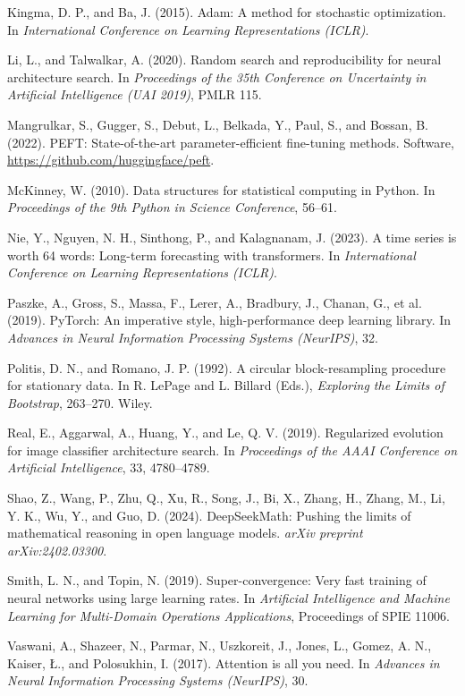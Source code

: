 \documentclass[11pt,letterpaper]{article}
\begin{document}
\begin{list}{}{\setlength{\leftmargin}{1.5em}\setlength{\itemindent}{-1.5em}\setlength{\itemsep}{2pt}\setlength{\parsep}{0pt}}
\item Kingma, D. P., and Ba, J. (2015). Adam: A method for stochastic optimization. In \textit{International Conference on Learning Representations (ICLR)}.
\item Li, L., and Talwalkar, A. (2020). Random search and reproducibility for neural architecture search. In \textit{Proceedings of the 35th Conference on Uncertainty in Artificial Intelligence (UAI 2019)}, PMLR 115.
\item Mangrulkar, S., Gugger, S., Debut, L., Belkada, Y., Paul, S., and Bossan, B. (2022). PEFT: State-of-the-art parameter-efficient fine-tuning methods. Software, \url{https://github.com/huggingface/peft}.
\item McKinney, W. (2010). Data structures for statistical computing in Python. In \textit{Proceedings of the 9th Python in Science Conference}, 56--61.
\item Nie, Y., Nguyen, N. H., Sinthong, P., and Kalagnanam, J. (2023). A time series is worth 64 words: Long-term forecasting with transformers. In \textit{International Conference on Learning Representations (ICLR)}.
\item Paszke, A., Gross, S., Massa, F., Lerer, A., Bradbury, J., Chanan, G., et al. (2019). PyTorch: An imperative style, high-performance deep learning library. In \textit{Advances in Neural Information Processing Systems (NeurIPS)}, 32.
\item Politis, D. N., and Romano, J. P. (1992). A circular block-resampling procedure for stationary data. In R. LePage and L. Billard (Eds.), \textit{Exploring the Limits of Bootstrap}, 263--270. Wiley.
\item Real, E., Aggarwal, A., Huang, Y., and Le, Q. V. (2019). Regularized evolution for image classifier architecture search. In \textit{Proceedings of the AAAI Conference on Artificial Intelligence}, 33, 4780--4789.
\item Shao, Z., Wang, P., Zhu, Q., Xu, R., Song, J., Bi, X., Zhang, H., Zhang, M., Li, Y. K., Wu, Y., and Guo, D. (2024). DeepSeekMath: Pushing the limits of mathematical reasoning in open language models. \textit{arXiv preprint arXiv:2402.03300}.
\item Smith, L. N., and Topin, N. (2019). Super-convergence: Very fast training of neural networks using large learning rates. In \textit{Artificial Intelligence and Machine Learning for Multi-Domain Operations Applications}, Proceedings of SPIE 11006.
\item Vaswani, A., Shazeer, N., Parmar, N., Uszkoreit, J., Jones, L., Gomez, A. N., Kaiser, \L{}., and Polosukhin, I. (2017). Attention is all you need. In \textit{Advances in Neural Information Processing Systems (NeurIPS)}, 30.

\end{list}
\end{document}
